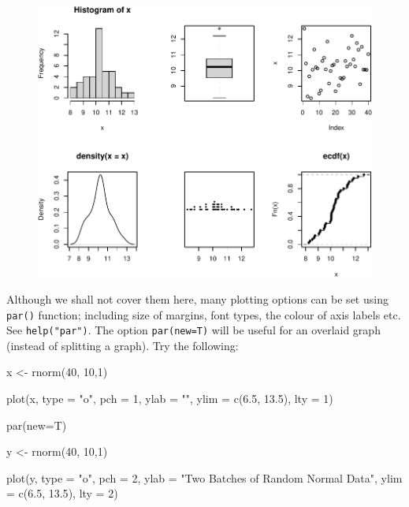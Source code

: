 \documentclass[
  letterpaper,
  DIV=11,
  numbers=noendperiod]{scrreprt}
\newenvironment{Shaded}{\begin{snugshade}}{\end{snugshade}}
\newcommand{\AttributeTok}[1]{\textcolor[rgb]{0.40,0.45,0.13}{#1}}
\newcommand{\DecValTok}[1]{\textcolor[rgb]{0.68,0.00,0.00}{#1}}
\newcommand{\FloatTok}[1]{\textcolor[rgb]{0.68,0.00,0.00}{#1}}
\newcommand{\FunctionTok}[1]{\textcolor[rgb]{0.28,0.35,0.67}{#1}}
\newcommand{\NormalTok}[1]{\textcolor[rgb]{0.00,0.23,0.31}{#1}}
\newcommand{\OtherTok}[1]{\textcolor[rgb]{0.00,0.23,0.31}{#1}}
\newcommand{\StringTok}[1]{\textcolor[rgb]{0.13,0.47,0.30}{#1}}
\begin{document}
\begin{figure}[H]

{\centering \includegraphics{0-R-tidyverse_files/figure-pdf/unnamed-chunk-19-1.pdf}

}

\end{figure}

Although we shall not cover them here, many plotting options can be set
using \texttt{par()} function; including size of margins, font types,
the colour of axis labels etc. See \texttt{help("par")}. The option
\texttt{par(new=T)} will be useful for an overlaid graph (instead of
splitting a graph). Try the following:

\begin{Shaded}
\begin{Highlighting}[]
\NormalTok{x  }\OtherTok{\textless{}{-}} \FunctionTok{rnorm}\NormalTok{(}\DecValTok{40}\NormalTok{, }\DecValTok{10}\NormalTok{,}\DecValTok{1}\NormalTok{)}

\FunctionTok{plot}\NormalTok{(x, }\AttributeTok{type =} \StringTok{"o"}\NormalTok{, }\AttributeTok{pch =} \DecValTok{1}\NormalTok{, }\AttributeTok{ylab =} \StringTok{""}\NormalTok{, }
     \AttributeTok{ylim =} \FunctionTok{c}\NormalTok{(}\FloatTok{6.5}\NormalTok{, }\FloatTok{13.5}\NormalTok{), }\AttributeTok{lty =} \DecValTok{1}\NormalTok{)}

\FunctionTok{par}\NormalTok{(}\AttributeTok{new=}\NormalTok{T)}

\NormalTok{y  }\OtherTok{\textless{}{-}}  \FunctionTok{rnorm}\NormalTok{(}\DecValTok{40}\NormalTok{, }\DecValTok{10}\NormalTok{,}\DecValTok{1}\NormalTok{)}

\FunctionTok{plot}\NormalTok{(y, }\AttributeTok{type =} \StringTok{"o"}\NormalTok{, }\AttributeTok{pch =} \DecValTok{2}\NormalTok{,}
     \AttributeTok{ylab =} \StringTok{"Two Batches of Random Normal Data"}\NormalTok{,}
     \AttributeTok{ylim =} \FunctionTok{c}\NormalTok{(}\FloatTok{6.5}\NormalTok{, }\FloatTok{13.5}\NormalTok{), }\AttributeTok{lty =} \DecValTok{2}\NormalTok{)}
\end{Highlighting}
\end{Shaded}
\end{document}
